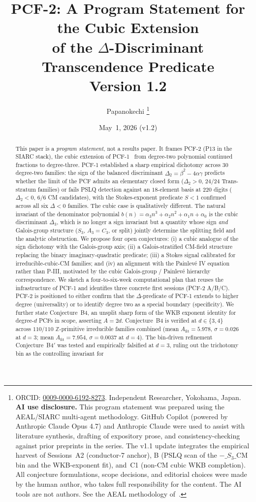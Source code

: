\documentclass[11pt,a4paper]{article}
\title{PCF-2: A Program Statement for the Cubic Extension\\
       of the $\Delta$-Discriminant Transcendence Predicate\\
       \large Version 1.2}
\author{Papanokechi%
\thanks{ORCID: \href{https://orcid.org/0009-0000-6192-8273}{0009-0000-6192-8273}.
Independent Researcher, Yokohama, Japan.
\textbf{AI use disclosure.} This program statement was prepared using the
AEAL/SIARC multi-agent methodology. GitHub Copilot (powered by Anthropic
Claude Opus 4.7) and Anthropic Claude were used to assist with literature
synthesis, drafting of expository prose, and consistency-checking against
prior preprints in the series. The v1.1 update integrates the empirical
harvest of Sessions~A2 (conductor-7 anchor), B (PSLQ scan of the
$-\_S_3\_\mathrm{CM}$ bin and the WKB-exponent fit), and~C1 (non-CM cubic
WKB completion). All conjecture formulations, scope decisions, and
editorial choices were made by the human author, who takes full
responsibility for the content. The AI tools are not authors. See the
AEAL methodology of~\cite{P8AEAL}.}}
\date{May~1, 2026 (v1.2)}
\theoremstyle{definition}
\theoremstyle{remark}
\newcommand{\Z}{\mathbb{Z}}
\begin{document}
\maketitle

\begin{abstract}
This paper is a \emph{program statement}, not a results paper. It frames
PCF-2 (P13 in the SIARC stack), the cubic extension of
PCF-1~\cite{Papanokechi2026PCF1} from degree-two polynomial continued
fractions to degree-three. PCF-1 established a sharp empirical dichotomy
across $30$ degree-two families: the sign of the balanced discriminant
$\Delta_{2}=\beta^{2}-4\alpha\gamma$ predicts whether the limit of the
PCF admits an elementary closed form ($\Delta_{2}>0$, $24/24$ Trans-stratum
families) or fails PSLQ detection against an $18$-element basis at $220$
digits ($\Delta_{2}<0$, $6/6$ CM candidates), with the Stokes-exponent
predicate $S<1$ confirmed across all six $\Delta<0$ families. The cubic
case is qualitatively different. The natural invariant of the denominator
polynomial $b(n)=\alpha_{3}n^{3}+\alpha_{2}n^{2}+\alpha_{1}n+\alpha_{0}$ is
the cubic discriminant $\Delta_{3}$, which is no longer a sign invariant
but a quantity whose sign \emph{and} Galois-group structure
($S_{3}$, $A_{3}=C_{3}$, or split) jointly determine the splitting field
and the analytic obstruction. We propose four open conjectures:
(i) a cubic analogue of the sign dichotomy with the Galois-group axis;
(ii) a Galois-stratified CM-field structure replacing the binary
imaginary-quadratic predicate;
(iii) a Stokes signal calibrated for irreducible-cubic-CM families;
and (iv) an alignment with the Painlev\'e IV equation rather than P-III,
motivated by the cubic Galois-group / Painlev\'e hierarchy correspondence.
We sketch a four-to-six-week computational plan that reuses the
infrastructure of PCF-1 and identifies three concrete first sessions
(PCF-2 A/B/C). PCF-2 is positioned to either confirm that the
$\Delta$-predicate of PCF-1 extends to higher degree (universality) or to
identify degree two as a special boundary (specificity).
We further state Conjecture~B4, an unsplit sharp form of the WKB
exponent identity for degree-$d$ PCFs in scope, asserting $A=2d$.
Conjecture~B4 is verified at $d\in\{3,4\}$ across $110/110$
$\Z$-primitive irreducible families combined (mean
$A_{\mathrm{fit}}=5.978$, $\sigma=0.026$ at $d=3$; mean
$A_{\mathrm{fit}}=7.954$, $\sigma=0.0037$ at $d=4$). The bin-driven
refinement Conjecture~B4$'$ was tested and empirically falsified at
$d=3$, ruling out the trichotomy bin as the controlling invariant for

\end{abstract}
\end{document}
